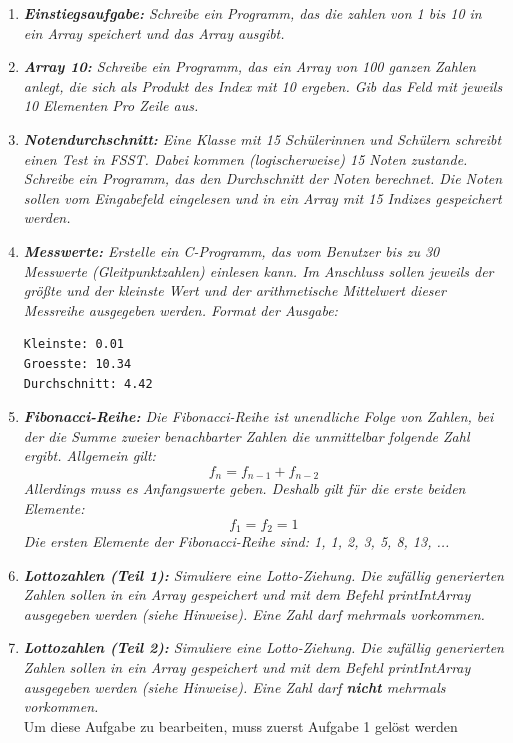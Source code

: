 \begin{enumerate}
\item \textit{\textbf{Einstiegsaufgabe:} Schreibe ein Programm, das die zahlen von 1 bis 10 in ein Array speichert und das Array ausgibt. }

\item \textit{\textbf{Array 10:} Schreibe ein Programm, das ein Array von 100 ganzen Zahlen anlegt, die sich als Produkt des Index mit 10 ergeben. Gib das Feld mit jeweils 10 Elementen Pro Zeile aus.}

\item \textit{\textbf{Notendurchschnitt:} Eine Klasse mit 15 Schülerinnen und Schülern schreibt einen Test in FSST. Dabei kommen (logischerweise) 15 Noten zustande. Schreibe ein Programm, das den Durchschnitt der Noten berechnet. Die Noten sollen vom Eingabefeld eingelesen und in ein Array mit 15 Indizes gespeichert werden.}

\item \textit{\textbf{Messwerte:} Erstelle ein C-Programm, das vom Benutzer bis zu 30 Messwerte (Gleitpunktzahlen) einlesen kann. Im Anschluss sollen jeweils der größte und der kleinste Wert und der arithmetische Mittelwert dieser Messreihe ausgegeben werden. Format der Ausgabe:}
\begin{lstlisting}
Kleinste: 0.01
Groesste: 10.34
Durchschnitt: 4.42
\end{lstlisting}

\item \textit{\textbf{Fibonacci-Reihe:} Die Fibonacci-Reihe ist unendliche Folge von Zahlen, bei der die Summe zweier benachbarter Zahlen die unmittelbar folgende Zahl ergibt. Allgemein gilt:
\begin{equation}
f_n = f_{n-1} + f_{n-2}
\end{equation}
Allerdings muss es Anfangswerte geben. Deshalb gilt für die erste beiden Elemente:
\begin{equation}
f_1 = f_2 = 1
\end{equation}
Die ersten Elemente der Fibonacci-Reihe sind: 1, 1, 2, 3, 5, 8, 13, ... }

\item \textit{\textbf{Lottozahlen (Teil 1):} Simuliere eine Lotto-Ziehung. Die zufällig generierten Zahlen sollen in ein Array gespeichert und mit dem Befehl printIntArray ausgegeben werden (siehe Hinweise). Eine Zahl darf mehrmals vorkommen.}

\item \textit{\textbf{Lottozahlen (Teil 2):} Simuliere eine Lotto-Ziehung. Die zufällig generierten Zahlen sollen in ein Array gespeichert und mit dem Befehl printIntArray ausgegeben werden (siehe Hinweise). Eine Zahl darf \textbf{nicht} mehrmals vorkommen.\\}
Um diese Aufgabe zu bearbeiten, muss zuerst Aufgabe 1 gelöst werden
\end{enumerate}


